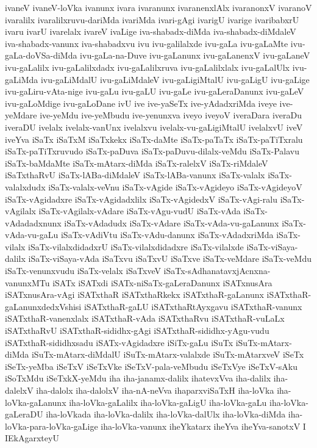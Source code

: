 {ivaneV
ivaneV-loVka
ivanunx
ivara
ivaranunx
ivaranenxlAlx
ivaranonxV
ivaranoV
ivaralilx
ivaralilxruvu-dariMda
ivariMda
ivari-gAgi
ivarigU
ivarige
ivaribabxrU
ivaru
ivarU
ivarelalx
ivareV
ivaLige
iva-shabadx-diMda
iva-shabadx-diMdaleV
iva-shabadx-vanunx
iva-shabadxvu
ivu
ivu-galilalxde
ivu-gaLa
ivu-gaLaMte
ivu-gaLa-doVSa-diMda
ivu-gaLa-na-Duve
ivu-gaLanunx
ivu-gaLanenxV
ivu-gaLaneV
ivu-gaLalilx
ivu-gaLalilxdadx
ivu-gaLalilxruva
ivu-gaLalilxlalx
ivu-gaLalUlx
ivu-gaLiMda
ivu-gaLiMdalU
ivu-gaLiMdaleV
ivu-gaLigiMtalU
ivu-gaLigU
ivu-gaLige
ivu-gaLiru-vAta-nige
ivu-gaLu
ivu-gaLU
ivu-gaLe
ivu-gaLeraDanunx
ivu-gaLeV
ivu-gaLoMdige
ivu-gaLoDane
ivU
ive
ive-yaSeTx
ive-yAdadxriMda
iveye
ive-yeMdare
ive-yeMdu
ive-yeMbudu
ive-yenunxva
iveyo
iveyoV
iveraDara
iveraDu
iveraDU
ivelalx
ivelalx-vanUnx
ivelalxvu
ivelalx-vu-gaLigiMtalU
ivelalxvU
iveV
iveYva
iSaTx
iSaTxM
iSaTxkekx
iSaTx-daMte
iSaTx-paTaTx
iSaTx-paTiTxralu
iSaTx-paTiTxruvudo
iSaTx-paDuva
iSaTx-paDuvu-dilalx-veMdu
iSaTx-Palavu
iSaTx-baMdaMte
iSaTx-mAtarx-diMda
iSaTx-ralelxV
iSaTx-riMdaleV
iSaTxthaRvU
iSaTx-lABa-diMdaleV
iSaTx-lABa-vanunx
iSaTx-valalx
iSaTx-valalxdudx
iSaTx-valalx-veVnu
iSaTx-vAgide
iSaTx-vAgideyo
iSaTx-vAgideyoV
iSaTx-vAgidadxre
iSaTx-vAgidadxlilx
iSaTx-vAgidedxV
iSaTx-vAgi-ralu
iSaTx-vAgilalx
iSaTx-vAgilalx-vAdare
iSaTx-vAgu-vudU
iSaTx-vAda
iSaTx-vAdadadxnunx
iSaTx-vAdadudx
iSaTx-vAdare
iSaTx-vAda-vu-gaLanunx
iSaTx-vAda-vu-gaLu
iSaTx-vAdiVtu
iSaTx-vAdu-danunx
iSaTx-vAdadxriMda
iSaTx-vilalx
iSaTx-vilalxdidadxrU
iSaTx-vilalxdidadxre
iSaTx-vilalxde
iSaTx-viSaya-dalilx
iSaTx-viSaya-vAda
iSaTxvu
iSaTxvU
iSaTxve
iSaTx-veMdare
iSaTx-veMdu
iSaTx-venunxvudu
iSaTx-velalx
iSaTxveV
iSaTx-sAdhanatavxjAcnxna-vanunxMTu
iSATx
iSATxdi
iSATx-niSaTx-gaLeraDanunx
iSATxnusAra
iSATxnusAra-vAgi
iSATxthaR
iSATxthaRkekx
iSATxthaR-gaLanunx
iSATxthaR-gaLanunxdedxVshisi
iSATxthaR-gaLU
iSATxthaRtAyxgavu
iSATxthaR-vanunx
iSATxthaR-vanenxlalx
iSATxthaR-vAda
iSATxthaRvu
iSATxthaR-vuLaLx
iSATxthaRvU
iSATxthaR-sididhx-gAgi
iSATxthaR-sididhx-yAgu-vudu
iSATxthaR-sididhxsadu
iSATx-vAgidadxre
iSiTx-gaLu
iSuTx
iSuTx-mAtarx-diMda
iSuTx-mAtarx-diMdalU
iSuTx-mAtarx-valalxde
iSuTx-mAtarxveV
iSeTx
iSeTx-yeMba
iSeTxV
iSeTxVke
iSeTxV-pala-veMbudu
iSeTxVye
iSeTxV-sAku
iSoTxMdu
iSeTxkX-yeMdu
iha
iha-janamx-dalilx
ihatevxVva
iha-dalilx
iha-dalelxV
iha-dalolx
iha-dalolxV
iha-nA-neVva
ihaparxviSaTxH
iha-loVka
iha-loVka-gaLanunx
iha-loVka-gaLalilx
iha-loVka-gaLigU
iha-loVka-gaLu
iha-loVka-gaLeraDU
iha-loVkada
iha-loVka-dalilx
iha-loVka-dalUlx
iha-loVka-diMda
iha-loVka-para-loVka-gaLige
iha-loVka-vanunx
iheYkatarx
iheYva
iheYva-sanotxV
I
IEkAgarxteyU
}
